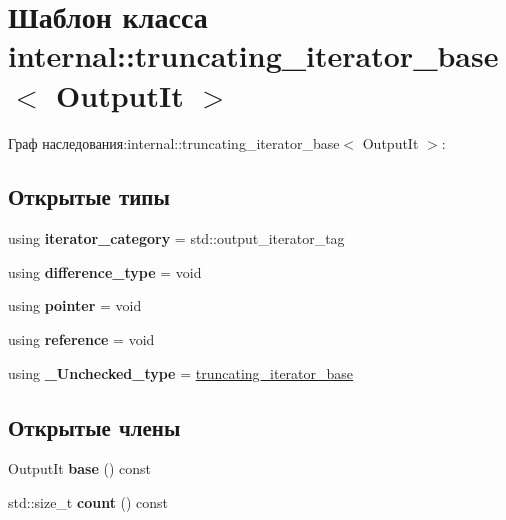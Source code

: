 \hypertarget{classinternal_1_1truncating__iterator__base}{}\section{Шаблон класса internal\+:\+:truncating\+\_\+iterator\+\_\+base$<$ Output\+It $>$}
\label{classinternal_1_1truncating__iterator__base}


Граф наследования\+:internal\+:\+:truncating\+\_\+iterator\+\_\+base$<$ Output\+It $>$\+:
\subsection*{Открытые типы}
\begin{DoxyCompactItemize}
\item 
\mbox{\label{classinternal_1_1truncating__iterator__base_a78b7484d9be9549ab5a95f3bf61398f3}} 
using {\bfseries iterator\+\_\+category} = std\+::output\+\_\+iterator\+\_\+tag
\item 
\mbox{\label{classinternal_1_1truncating__iterator__base_a69e4dedd8056b28718f945ee4873bc95}} 
using {\bfseries difference\+\_\+type} = void
\item 
\mbox{\label{classinternal_1_1truncating__iterator__base_ac84e2beff101d03d3c17a04cf7ce63c2}} 
using {\bfseries pointer} = void
\item 
\mbox{\label{classinternal_1_1truncating__iterator__base_ad5d3b5ad74f645d5501fff873964597e}} 
using {\bfseries reference} = void
\item 
\mbox{\label{classinternal_1_1truncating__iterator__base_a8032b9b705c618b433209881bc3f5ad8}} 
using {\bfseries \+\_\+\+Unchecked\+\_\+type} = \hyperlink{classinternal_1_1truncating__iterator__base}{truncating\+\_\+iterator\+\_\+base}
\end{DoxyCompactItemize}
\subsection*{Открытые члены}
\begin{DoxyCompactItemize}
\item 
\mbox{\label{classinternal_1_1truncating__iterator__base_a9448497520d8f10cee98ce6c41a57d70}} 
Output\+It {\bfseries base} () const
\item 
\mbox{\label{classinternal_1_1truncating__iterator__base_a14dfca041b5ab9ab7e8a6f35fef06a5b}} 
std\+::size\+\_\+t {\bfseries count} () const
\end{DoxyCompactItemize}
